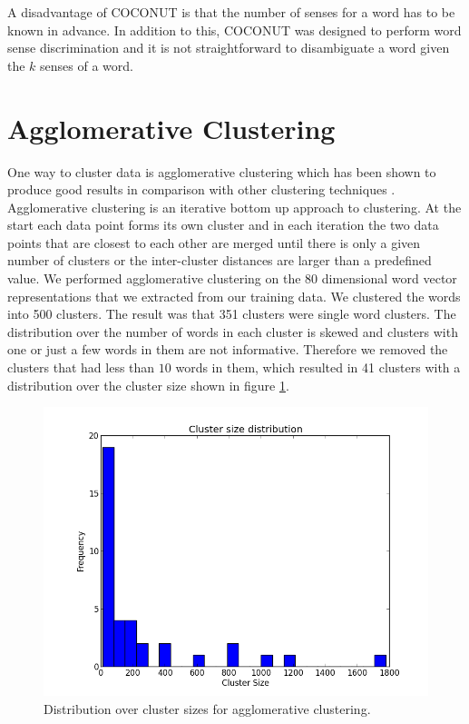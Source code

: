 \documentclass[11pt]{article}
\begin{document}
A disadvantage of COCONUT is that the number of senses for a word has to be known in advance. In addition to this, COCONUT was designed to perform word sense discrimination and it is not straightforward to disambiguate a word given the $k$ senses of a word. 

\section{Agglomerative Clustering}
One way to cluster data is agglomerative clustering which has been shown to produce good results in comparison with other clustering techniques \cite{clustering}. Agglomerative clustering is an iterative bottom up approach to clustering. At the start each data point forms its own cluster and in each iteration the two data points that are closest to each other are merged until there is only a given number of clusters or the inter-cluster distances are larger than a predefined value. We performed agglomerative clustering on the $80$ dimensional word vector representations that we extracted from our training data. We clustered the words into 500 clusters. The result was that 351 clusters were single word clusters. The distribution over the number of words in each cluster is skewed and clusters with one or just a few words in them are not informative. Therefore we removed the clusters that had less than $10$ words in them, which resulted in 41 clusters with a distribution over the cluster size shown in figure \ref{cluster_size}.
\begin{figure}
\center
\includegraphics[scale=0.40]{images/cluster_size.png}
\caption{Distribution over cluster sizes for agglomerative clustering.}
\label{cluster_size}
\end{figure}
\end{document}
